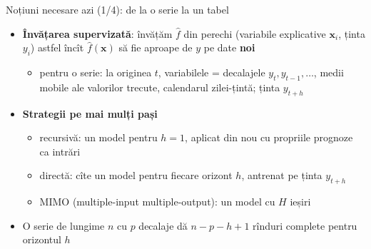\begin{frame}{Noțiuni necesare azi (1/4): de la o serie la un tabel}
\itemsize{\small}
\begin{itemize}
    \item \textbf{Învățarea supervizată}: învățăm $\hat f$ din perechi (variabile explicative $\mathbf{x}_i$, ținta $y_i$) astfel încît $\hat f(\mathbf{x})$ să fie aproape de $y$ pe date \textbf{noi}
    \begin{itemize}
        \item pentru o serie: la originea $t$, variabilele = decalajele $y_t, y_{t-1}, \dots$, medii mobile ale valorilor trecute, calendarul zilei-țintă; ținta $y_{t+h}$
    \end{itemize}
    \item \textbf{Strategii pe mai mulți pași}
    \begin{itemize}
        \item recursivă: un model pentru $h = 1$, aplicat din nou cu propriile prognoze ca intrări
        \item directă: cîte un model pentru fiecare orizont $h$, antrenat pe ținta $y_{t+h}$
        \item MIMO (multiple-input multiple-output): un model cu $H$ ieșiri
    \end{itemize}
    \item O serie de lungime $n$ cu $p$ decalaje dă $n - p - h + 1$ rînduri complete pentru orizontul $h$
\end{itemize}
\end{frame}

